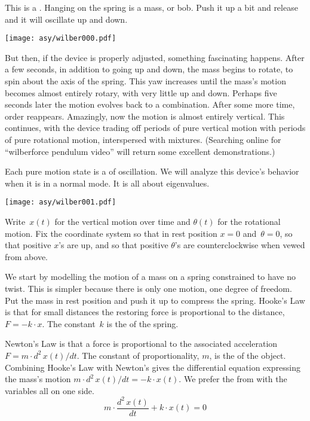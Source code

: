 
% 

This is a .
Hanging on the spring is a mass, or bob.
Push it up a bit and release and it will oscillate up and down.
\begin{center}
  \texttt{[image: asy/wilber000.pdf]}
\end{center}
But then, if the device is properly adjusted, something fascinating happens.
After a few seconds, in addition to going up
and down, the mass begins to rotate,
to spin about the axis of the spring.
This yaw increases until the mass's motion  
becomes almost entirely rotary, with very little up and down.
Perhaps five seconds later the motion evolves back to a combination.
After some more time, order reappears.
Amazingly, now
the motion is almost entirely vertical.
This continues, with the device trading off
periods of pure vertical motion with periods of pure rotational motion,
interspersed with mixtures. 
(Searching online for ``wilberforce pendulum video'' will return 
some excellent demonstrations.) 

Each pure motion state is a  of oscillation.
We will analyze this device's behavior when it is in a normal mode. 
It is all about eigenvalues.

\begin{center}
  \texttt{[image: asy/wilber001.pdf]}
\end{center}

Write~$x(t)$ for the vertical motion over time and 
$\theta(t)$ for the rotational motion.
Fix the coordinate system so that in rest position $x=0$ and~$\theta=0$, 
so that positive $x$'s are up, and so that positive $\theta$'s
are counterclockwise when vewed from above.

We start by modelling the motion of a mass on a 
spring constrained to have no twist.
This is simpler because there is only one motion, one degree of freedom.
Put the mass in rest position and 
push it up to compress the spring.
Hooke's Law is that for small distances
the restoring force is 
proportional to the distance, $F=-k\cdot x$.
The constant~$k$ is the
 of the spring.

Newton's Law is that a force is proportional to the 
associated acceleration $F=m\cdot d^2\,x(t)/dt$.
The constant of proportionality, $m$, is the 
of the object.
Combining Hooke's Law with Newton's 
gives the differential equation expressing the 
mass's motion $m\cdot d^2\,x(t)/dt=-k\cdot x(t)$.
We prefer the from with the variables all on one side.
\begin{equation*}
  m\cdot \frac{d^2\,x(t)}{dt}+k\cdot x(t)=0
  \tag{$*$}
\end{equation*}

